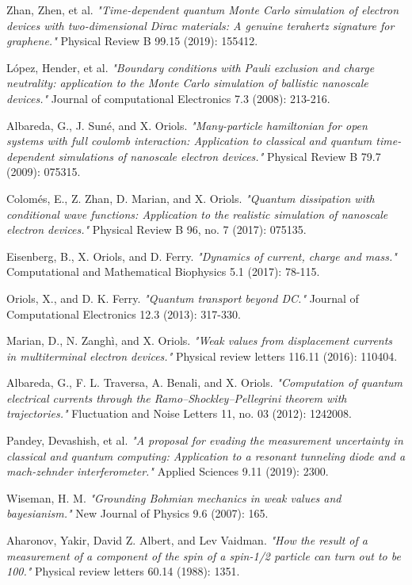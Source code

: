 \documentclass[11pt, a4paper]{article} %
\begin{document}
\begin{thebibliography}{1}
{
Zhan, Zhen, et al. {\em "Time-dependent quantum Monte Carlo simulation of electron devices with two-dimensional Dirac materials: A genuine terahertz signature for graphene."} Physical Review B 99.15 (2019): 155412.

López, Hender, et al. {\em "Boundary conditions with Pauli exclusion and charge neutrality: application to the Monte Carlo simulation of ballistic nanoscale devices."} Journal of computational Electronics 7.3 (2008): 213-216.

Albareda, G., J. Suné, and X. Oriols. {\em "Many-particle hamiltonian for open systems with full coulomb interaction: Application to classical and quantum time-dependent simulations of nanoscale electron devices."} Physical Review B 79.7 (2009): 075315.

Colomés, E., Z. Zhan, D. Marian, and X. Oriols. {\em "Quantum dissipation with conditional wave functions: Application to the realistic simulation of nanoscale electron devices."} Physical Review B 96, no. 7 (2017): 075135.

Eisenberg, B., X. Oriols, and D. Ferry. {\em "Dynamics of current, charge and mass."} Computational and Mathematical Biophysics 5.1 (2017): 78-115.

Oriols, X., and D. K. Ferry. {\em "Quantum transport beyond DC."} Journal of Computational Electronics 12.3 (2013): 317-330.

Marian, D., N. Zanghì, and X. Oriols. {\em "Weak values from displacement currents in multiterminal electron devices."} Physical review letters 116.11 (2016): 110404.

Albareda, G., F. L. Traversa, A. Benali, and X. Oriols. {\em "Computation of quantum electrical currents through the Ramo–Shockley–Pellegrini theorem with trajectories."} Fluctuation and Noise Letters 11, no. 03 (2012): 1242008.

Pandey, Devashish, et al. {\em "A proposal for evading the measurement uncertainty in classical and quantum computing: Application to a resonant tunneling diode and a mach-zehnder interferometer."} Applied Sciences 9.11 (2019): 2300.

Wiseman, H. M. {\em "Grounding Bohmian mechanics in weak values and bayesianism."} New Journal of Physics 9.6 (2007): 165.

Aharonov, Yakir, David Z. Albert, and Lev Vaidman. {\em "How the result of a measurement of a component of the spin of a spin-1/2 particle can turn out to be 100."} Physical review letters 60.14 (1988): 1351.

}
\end{thebibliography}
\end{document}
